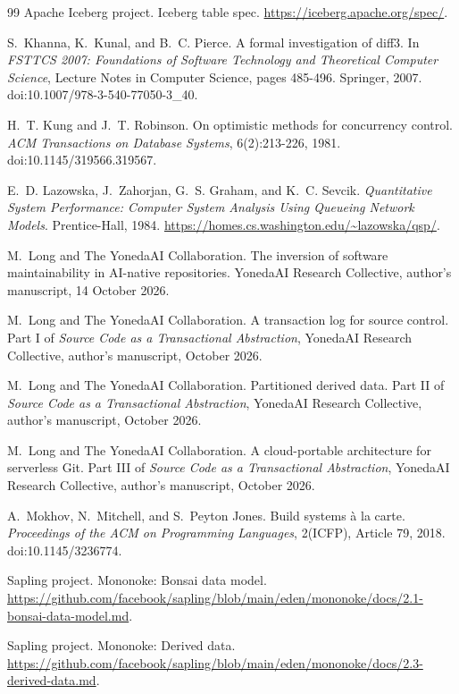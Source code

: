 \documentclass[11pt,letterpaper]{article}
\theoremstyle{definition}
\theoremstyle{remark}
\begin{document}
\begin{thebibliography}{99}
Apache Iceberg project.
Iceberg table spec.
\url{https://iceberg.apache.org/spec/}.

S.~Khanna, K.~Kunal, and B.~C. Pierce.
A formal investigation of diff3.
In \emph{FSTTCS 2007: Foundations of Software Technology and Theoretical Computer Science}, Lecture Notes in Computer Science, pages 485-496. Springer, 2007.
doi:10.1007/978-3-540-77050-3\_40.

H.~T. Kung and J.~T. Robinson.
On optimistic methods for concurrency control.
\emph{ACM Transactions on Database Systems}, 6(2):213-226, 1981.
doi:10.1145/319566.319567.

E.~D. Lazowska, J.~Zahorjan, G.~S. Graham, and K.~C. Sevcik.
\emph{Quantitative System Performance: Computer System Analysis Using Queueing Network Models}.
Prentice-Hall, 1984.
\url{https://homes.cs.washington.edu/~lazowska/qsp/}.

M.~Long and The YonedaAI Collaboration.
The inversion of software maintainability in AI-native repositories.
YonedaAI Research Collective, author's manuscript, 14 October 2026.

M.~Long and The YonedaAI Collaboration.
A transaction log for source control.
Part I of \emph{Source Code as a Transactional Abstraction}, YonedaAI Research Collective, author's manuscript, October 2026.

M.~Long and The YonedaAI Collaboration.
Partitioned derived data.
Part II of \emph{Source Code as a Transactional Abstraction}, YonedaAI Research Collective, author's manuscript, October 2026.

M.~Long and The YonedaAI Collaboration.
A cloud-portable architecture for serverless Git.
Part III of \emph{Source Code as a Transactional Abstraction}, YonedaAI Research Collective, author's manuscript, October 2026.

A.~Mokhov, N.~Mitchell, and S.~Peyton Jones.
Build systems {\`a} la carte.
\emph{Proceedings of the ACM on Programming Languages}, 2(ICFP), Article 79, 2018.
doi:10.1145/3236774.

Sapling project.
Mononoke: Bonsai data model.
\url{https://github.com/facebook/sapling/blob/main/eden/mononoke/docs/2.1-bonsai-data-model.md}.

Sapling project.
Mononoke: Derived data.
\url{https://github.com/facebook/sapling/blob/main/eden/mononoke/docs/2.3-derived-data.md}.


\end{thebibliography}
\end{document}
